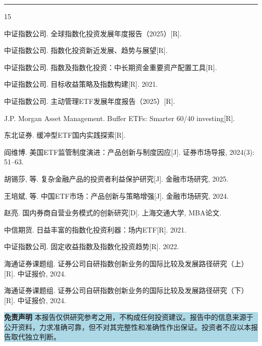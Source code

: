 \documentclass[10pt,a4paper,twocolumn]{ctexart}
\begin{document}
\vspace{8pt}
\noindent\textcolor{themeblue}{\rule{\columnwidth}{1.2pt}}
\vspace{2pt}

\begin{thebibliography}{15}
\small
\setlength{\itemsep}{2pt}

 中证指数公司. 全球指数化投资发展年度报告（2025）[R].

 中证指数公司. 指数化投资新近发展、趋势与展望[R].

 中证指数公司. 指数及指数化投资：中长期资金重要资产配置工具[R].

 中证指数公司. 目标收益策略及指数构建[R]. 2021.

 中证指数公司. 主动管理ETF发展年度报告（2025）[R].

 J.P. Morgan Asset Management. Buffer ETFs: Smarter 60/40 investing[R].

 东北证券. 缓冲型ETF国内实践探索[R].

 阎维博. 美国ETF监管制度演进：产品创新与制度因应[J]. 证券市场导报, 2024(3): 51--63.

 胡锡莎, 等. 复杂金融产品的投资者利益保护研究[J]. 金融市场研究, 2025.

 王培斌, 等. 中国ETF市场：产品创新与策略增强[J]. 金融市场研究, 2024.

 赵亮. 国内券商自营业务模式的创新研究[D]. 上海交通大学, MBA论文.

 中信期货. 日益丰富的指数化投资利器：场内ETF[R]. 2021.

 中证指数公司. 固定收益指数及指数化投资趋势[R]. 2022.

 海通证券课题组. 证券公司自研指数创新业务的国际比较及发展路径研究（上）[R]. 中证报价, 2024.

 海通证券课题组. 证券公司自研指数创新业务的国际比较及发展路径研究（下）[R]. 中证报价, 2024.

\end{thebibliography}

\vspace{6pt}
\noindent\colorbox{lightblue}{%
\parbox{\columnwidth}{\small\vspace{4pt}
\textbf{\color{themeblue}免责声明}\quad
本报告仅供研究参考之用，不构成任何投资建议。报告中的信息来源于公开资料，力求准确可靠，但不对其完整性和准确性作出保证。投资者不应以本报告取代独立判断。
\vspace{4pt}}}
\end{document}
